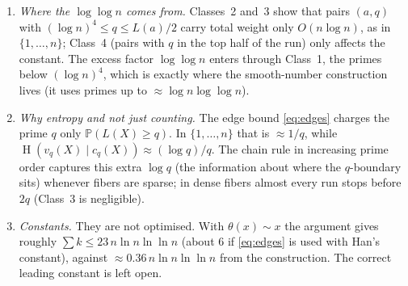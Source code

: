 \documentclass[11pt]{article}
\theoremstyle{remark}
\newcommand{\Pp}{\mathbb{P}}
\DeclareMathOperator{\HH}{H}
\begin{document}
\begin{enumerate}[leftmargin=*,itemsep=4pt]
\item \emph{Where the $\log\log n$ comes from.}
Classes~2 and~3 show that pairs $(a,q)$ with $(\log n)^4\le q\le L(a)/2$ carry total weight only $O(n\log n)$, as in $\{1,\dots,n\}$; Class~4 (pairs with $q$ in the top half of the run) only affects the constant.
The excess factor $\log\log n$ enters through Class~1, the primes below $(\log n)^4$, which is exactly where the smooth-number construction lives (it uses primes up to $\approx\log n\log\log n$).

\item \emph{Why entropy and not just counting.}
The edge bound \eqref{eq:edges} charges the prime $q$ only $\Pp(L(X)\ge q)$.
In $\{1,\dots,n\}$ that is $\approx 1/q$, while $\HH(v_q(X)\mid c_q(X))\approx(\log q)/q$.
The chain rule in increasing prime order captures this extra $\log q$ (the information about where the $q$-boundary sits) whenever fibers are sparse; in dense fibers almost every run stops before $2q$ (Class~3 is negligible).

\item \emph{Constants.}
They are not optimised.
With $\theta(x)\sim x$ the argument gives roughly $\sum k\le 23\,n\ln n\ln\ln n$ (about $6$ if \eqref{eq:edges} is used with Han's constant), against $\approx0.36\,n\ln n\ln\ln n$ from the construction.
The correct leading constant is left open.
\end{enumerate}
\end{document}
